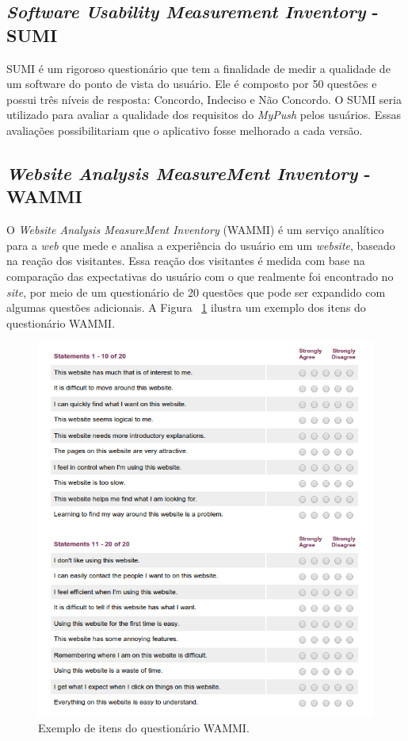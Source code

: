 \subsection{\textit{Software Usability Measurement Inventory} - SUMI}
      
      \nocite{summi}
      SUMI é um rigoroso questionário que tem a finalidade de medir a qualidade de um software do ponto de vista do usuário.
      Ele é composto por 50 questões e possui três níveis de resposta: Concordo, Indeciso e Não Concordo. O SUMI seria utilizado
      para avaliar a qualidade dos requisitos do \textit{MyPush} pelos usuários. Essas avaliações possibilitariam que o aplicativo fosse
      melhorado a cada versão.
      
    \subsection{\textit{Website Analysis MeasureMent Inventory} - WAMMI}
      
      \nocite{wammi}
      O \textit{Website Analysis MeasureMent Inventory} (WAMMI) é um serviço analítico para a \textit{web} que mede e analisa a experiência do
      usuário em um \textit{website}, baseado na reação dos visitantes. Essa reação dos visitantes é medida com base na comparação das
      expectativas do usuário com o que realmente foi encontrado no \textit{site}, por meio de um questionário de 20 questões que pode
      ser expandido com algumas questões adicionais. A Figura ~\ref{wammi_questions} ilustra um exemplo dos itens do questionário WAMMI.
      
      \begin{figure}[!htpb]
	\centering
	\includegraphics[scale=0.67]{editaveis/figuras/wammi_questions}
	\caption[Exemplo de itens do questionário WAMMI]{Exemplo de itens do questionário WAMMI. \footnotemark}
	\label{wammi_questions}
      \end{figure}
      
